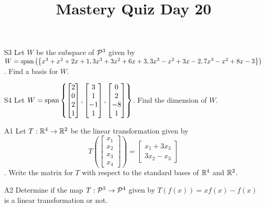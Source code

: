 \documentclass{sbgLAquiz}
\title{Mastery Quiz Day 20 }
\begin{document}
\begin{problem}{S3}
Let $W$ be the subspace of $\P^3$ given by $W = {\rm span} \left( \left\{ x^3+x^2+2x+1, 3x^3+3x^2+6x+3, 3x^3-x^2+3x-2, 7x^3-x^2+8x-3 \right\} \right)$.  Find a basis for $W$.
\end{problem}

\begin{problem}{S4}
Let \(
  W={\rm span}\left\{
    \begin{bmatrix} 2 \\ 0 \\ 2 \\ 1 \end{bmatrix},
    \begin{bmatrix} 3 \\ 1 \\ -1 \\ 1 \end{bmatrix},
    \begin{bmatrix} 0 \\ 2 \\ -8 \\ 1 \end{bmatrix}
  \right\}
\). Find the dimension of \(W\).
\end{problem}
\newpage

\begin{problem}{A1}
Let $T: \IR^4 \rightarrow \IR^2$ be the linear transformation given by $$T\left(\begin{bmatrix} x_1 \\ x_2 \\ x_3 \\ x_4 \end{bmatrix} \right) = \begin{bmatrix} x_1+3x_3 \\ 3x_2-x_3 \end{bmatrix}$$. Write the matrix for $T$ with respect to the standard bases of $\IR^4$ and $\IR^2$.
\end{problem}

\begin{problem}{A2}
Determine if the map $T: \P^3 \rightarrow \P^4$ given by $T(f(x))=xf(x)-f(x)$ is a linear transformation or not.
\end{problem}
\end{document}
